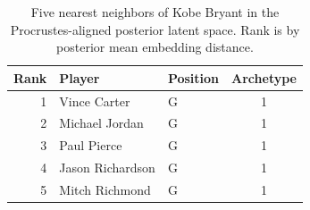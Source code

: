 \begin{table}[htbp]
  \centering\small
  \begin{tabular}{rllc}
    \toprule
    Rank & Player & Position & Archetype \\
    \midrule
    1 & Vince Carter & G & 1 \\
    2 & Michael Jordan & G & 1 \\
    3 & Paul Pierce & G & 1 \\
    4 & Jason Richardson & G & 1 \\
    5 & Mitch Richmond & G & 1 \\
    \bottomrule
  \end{tabular}
  \caption{Five nearest neighbors of Kobe Bryant in the Procrustes-aligned posterior latent space. Rank is by posterior mean embedding distance.}
  \label{tab:Kobe_Bryant_neighbors}
\end{table}

